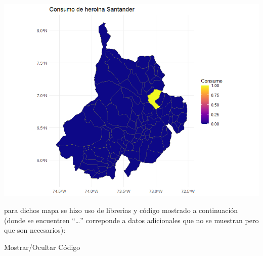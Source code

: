 \documentclass[
]{article}
\begin{document}
\includegraphics{images/Mapa consumo de heroina en santander.png}

para dichos mapa se hizo uso de librerias y código mostrado a
continuación (donde se encuentren ``\ldots{}'' correponde a datos
adicionales que no se muestran pero que son necesarios):

Mostrar/Ocultar Código
\end{document}
